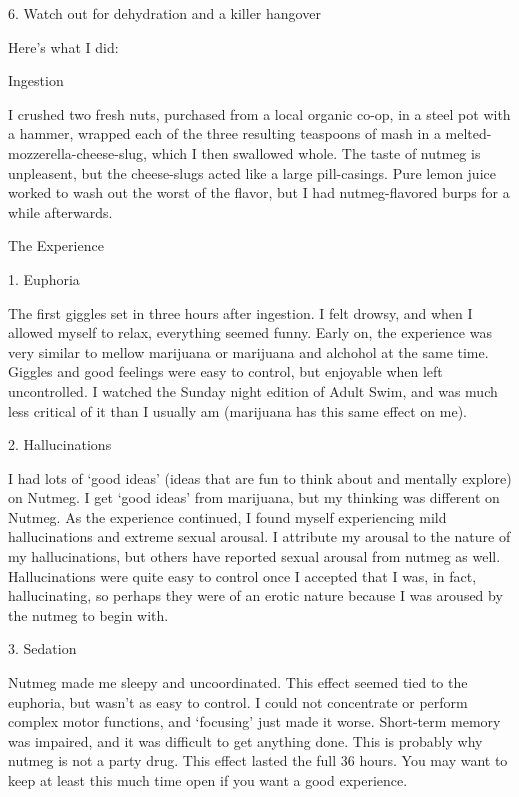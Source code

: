 \documentclass[letterpaper,12pt]{article}
\begin{document}
6.  Watch out for dehydration and a killer hangover



Here's what I did:



Ingestion



I crushed two fresh nuts, purchased from a local organic co-op, in a steel pot with a hammer, wrapped each of the three resulting teaspoons of mash in a melted-mozzerella-cheese-slug, which I then swallowed whole.  The taste of nutmeg is unpleasent, but the cheese-slugs acted like a large pill-casings.  Pure lemon juice worked to wash out the worst of the flavor, but I had nutmeg-flavored burps for a while afterwards.



The Experience



1.  Euphoria



The first giggles set in three hours after ingestion.  I felt drowsy, and when I allowed myself to relax, everything seemed funny.  Early on, the experience was very similar to mellow marijuana or marijuana and alchohol at the same time.  Giggles and good feelings were easy to control, but enjoyable when left uncontrolled.  I watched the Sunday night edition of Adult Swim, and was much less critical of it than I usually am (marijuana has this same effect on me).



2.  Hallucinations



I had lots of `good ideas' (ideas that are fun to think about and mentally explore) on Nutmeg.  I get `good ideas' from marijuana, but my thinking was different on Nutmeg.  As the experience continued, I found myself experiencing mild hallucinations and extreme sexual arousal.  I attribute my arousal to the nature of my hallucinations, but others have reported sexual arousal from nutmeg as well.  Hallucinations were quite easy to control once I accepted that I was, in fact, hallucinating, so perhaps they were of an erotic nature because I was aroused by the nutmeg to begin with.



3.  Sedation



Nutmeg made me sleepy and uncoordinated.  This effect seemed tied to the euphoria, but wasn't as easy to control.  I could not concentrate or perform complex motor functions, and `focusing' just made it worse.  Short-term memory was impaired, and it was difficult to get anything done.  This is probably why nutmeg is not a party drug.  This effect lasted the full 36 hours.  You may want to keep at least this much time open if you want a good experience.
\end{document}

